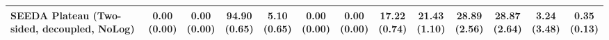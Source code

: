 \begin{table}[H]
{\begin{tabular}{l|cccccc|cccccc}
SEEDA Plateau (Two-sided, decoupled, NoLog) & \makecell{0.00 \\ (0.00)} & \makecell{0.00 \\ (0.00)} & {\cellcolor[HTML]{C8E6C9}} \bfseries \makecell{94.90 \\ (0.65)} & \makecell{5.10 \\ (0.65)} & \makecell{0.00 \\ (0.00)} & \makecell{0.00 \\ (0.00)} & \makecell{17.22 \\ (0.74)} & \makecell{21.43 \\ (1.10)} & {\cellcolor[HTML]{C8E6C9}} \bfseries \makecell{28.89 \\ (2.56)} & \makecell{28.87 \\ (2.64)} & \makecell{3.24 \\ (3.48)} & \makecell{0.35 \\ (0.13)} \\
\bottomrule
\end{tabular}
}%
\end{table}

